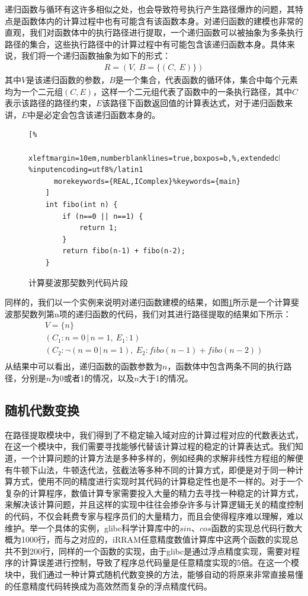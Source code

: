 递归函数与循环有这许多相似之处，也会导致符号执行产生路径爆炸的问题，其特点是函数体内的计算过程中也有可能含有该函数本身。对递归函数的建模也非常的直观，我们对函数体中的执行路径进行提取，一个递归函数可以被抽象为多条执行路径的集合，这些执行路径中的计算过程中有可能包含该递归函数本身。具体来说，我们将一个递归函数抽象为如下的形式：
\begin{gather*}
    R = (V,\ B = \{(C,\ E)\})
\end{gather*}
其中$V$是该递归函数的参数，$B$是一个集合，代表函数的循环体，集合中每个元素均为一个二元组$(C, E)$，这样一个二元组代表了函数中的一条执行路径，其中$C$表示该路径的路径约束，$E$该路径下函数返回值的计算表达式，对于递归函数来讲，$E$中是必定会包含该递归函数本身的。

\begin{figure}[htbp]
  \centering
  \begin{lstlisting}[%
      xleftmargin=10em,numberblanklines=true,boxpos=b,%,extendedchars=\true, %inputencoding=utf8%/latin1
      morekeywords={REAL,IComplex}%keywords={main}
    ]
    int fibo(int n) {
        if (n==0 || n==1) {
            return 1;
        }
        return fibo(n-1) + fibo(n-2);
    }
  \end{lstlisting}
  \caption{计算斐波那契数列代码片段}\label{lst:fibocode}
\end{figure}

同样的，我们以一个实例来说明对递归函数建模的结果，如图\ref{lst:fibocode}所示是一个计算斐波那契数列第n项的递归函数的代码，我们对其进行路径提取的结果如下所示：
\begin{gather*}
  V = \{n\}\\
  (C_1: n=0\,|\,n=1,\ E_1: 1) \\
  (C_2: \neg (n=0\,|\,n=1),\ E_2: fibo(n-1)+fibo(n-2))\\
\end{gather*}
从结果中可以看出，递归函数的函数参数为$n$，函数体中包含两条不同的执行路径，分别是$n$为0或者1的情况，以及$n$大于1的情况。

\subsection{随机代数变换}

在路径提取模块中，我们得到了不稳定输入域对应的计算过程对应的代数表达式，在这一个模块中，我们需要寻找能够代替该计算过程的稳定的计算表达式。我们知道，一个计算问题的计算方法是多种多样的，例如经典的求解非线性方程组的解便有牛顿下山法，牛顿迭代法，弦截法等多种不同的计算方式，即便是对于同一种计算方式，使用不同的精度进行实现时其代码的计算稳定性也是不一样的。对于一个复杂的计算程序，数值计算专家需要投入大量的精力去寻找一种稳定的计算方式，来解决该计算问题，并且这样的实现中往往会掺杂许多与计算逻辑无关的精度控制的代码，不仅会耗费专家与程序员们的大量精力，而且会使得程序难以理解，难以维护。举一个具体的实例，glibc科学计算库中的$sin$、$cos$函数的实现总代码行数大概为1000行，而与之对应的，iRRAM任意精度数值计算库中这两个函数的实现总共不到200行，同样的一个函数的实现，由于glibc是通过浮点精度实现，需要对程序的计算误差进行控制，导致了程序总代码量是任意精度实现的5倍。在这一个模块中，我们通过一种计算式随机代数变换的方法，能够自动的将原来非常直接易懂的任意精度代码转换成为高效然而复杂的浮点精度代码。
